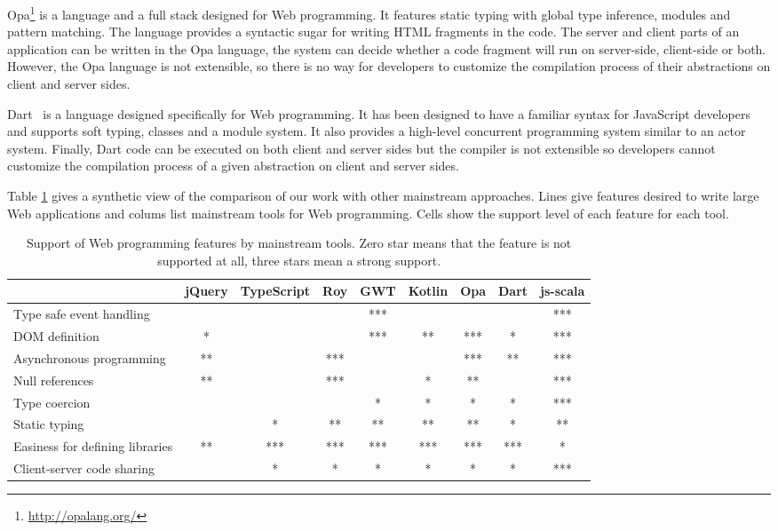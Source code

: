 \documentclass[american,english,runningheads]{llncs}
\begin{document}
Opa\footnote{\href{http://opalang.org/}{http://opalang.org/}} is a language and a full stack designed for Web
programming. It features static typing with global type inference, modules and pattern matching. The language
provides a syntactic sugar for writing HTML fragments in the code. The server and client parts of an application can
be written in the Opa language, the system can decide whether a code fragment will run on server-side, client-side or
both. However, the Opa language is not extensible, so there is no way for developers to customize the compilation
process of their abstractions on client and server sides.

Dart~\cite{Griffith11_Dart} is a language designed specifically for Web programming. It has been designed to have a
familiar syntax for JavaScript developers and supports soft typing, classes and a module system. It also provides a
high-level concurrent programming system similar to an actor system. Finally, Dart code can be executed on both
client and server sides but the compiler is not extensible so developers cannot customize the compilation process of
a given abstraction on client and server sides.

Table \ref{comparison} gives a synthetic view of the comparison of our work with other mainstream approaches. Lines
give features desired to write large Web applications and colums list mainstream tools for Web programming. Cells
show the support level of each feature for each tool.

\begin{table}
\centering
\begin{tabular}{| l | c | c | c | c | c | c | c | c |}
\hline
& jQuery & TypeScript & Roy & GWT & Kotlin & Opa & Dart & js-scala \\
\hline
Type safe event handling & & & & *** & & & & *** \\
\hline
DOM definition & * & & & *** & ** & *** & * & *** \\
\hline
Asynchronous programming & ** & & *** & & & *** & ** & *** \\
\hline
Null references & ** & & *** & & * & ** & & *** \\
\hline
Type coercion & & & & * & * & * & * & *** \\
\hline
Static typing & & * & ** & ** & ** & ** & * & ** \\
\hline
Easiness for defining libraries & ** & *** & *** & *** & *** & *** & *** & * \\
\hline
Client-server code sharing & & * & * & * & * & *  & * & *** \\
\hline
\end{tabular}
\caption{Support of Web programming features by mainstream tools. Zero star means that the feature is not supported
at all, three stars mean a strong support.}
\label{comparison}
\end{table}
\end{document}
